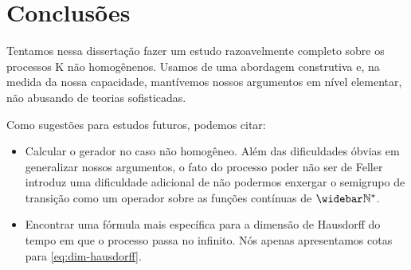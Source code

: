 \chapter{Conclusões}
\label{cap:conclusao}

Tentamos nessa dissertação fazer um estudo razoavelmente completo
sobre os processos K não homogênenos. Usamos de uma abordagem
construtiva e, na medida da nossa capacidade, mantívemos nossos
argumentos em nível elementar, não abusando de teorias sofisticadas.

Como sugestões para estudos futuros, podemos citar:

\begin{itemize}
\item Calcular o gerador no caso não homogêneo. Além das dificuldades
  óbvias em generalizar nossos argumentos, o fato do processo poder
  não ser de Feller introduz uma dificuldade adicional de não podermos
  enxergar o semigrupo de transição como um operador sobre as funções
  contínuas de $\Nzb$.

\item Encontrar uma fórmula mais específica para a dimensão de
  Hausdorff do tempo em que o processo passa no infinito. Nós
  apenas apresentamos cotas para \eqref{eq:dim-hausdorff}.
\end{itemize}



